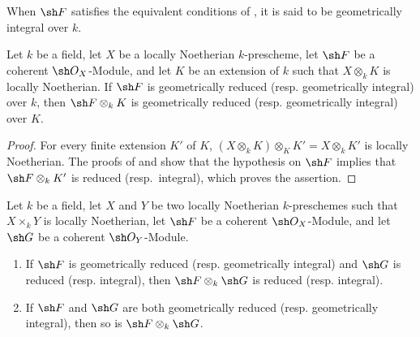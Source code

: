 \begin{definition}[4.6.19]
\label{IV.4.6.19}
When $\sh F$ satisfies the equivalent conditions of
, it is said to be geometrically integral over
$k$.
\end{definition}

\begin{proposition}[4.6.20]
\label{IV.4.6.20}
Let $k$ be a field, let $X$ be a locally Noetherian $k$-prescheme,
let $\sh F$ be a coherent $\sh O_X$-Module, and let $K$ be an
extension of $k$ such that $X\otimes_kK$ is locally Noetherian.
If $\sh F$ is geometrically reduced
\textup{(resp.} geometrically integral) over $k$, then
$\sh F\otimes_kK$ is geometrically reduced
\textup{(resp.} geometrically integral) over $K$.
\end{proposition}

\begin{proof}
For every finite extension $K'$ of $K$,
$(X\otimes_k K)\otimes_K K'=X\otimes_k K'$
is locally Noetherian.
The proofs of  and  show that the
hypothesis on $\sh F$ implies that $\sh F\otimes_kK'$ is reduced
(resp.\ integral), which proves the assertion.
\end{proof}

\begin{proposition}[4.6.21]
\label{IV.4.6.21}
Let $k$ be a field, let $X$ and $Y$ be two locally Noetherian
$k$-preschemes such that $X\times_kY$ is locally Noetherian, let
$\sh F$ be a coherent $\sh O_X$-Module, and let $\sh G$ be a coherent
$\sh O_Y$-Module.
\begin{enumerate}
\item[\rm(i)]
\label{IV.4.6.21.i}
If $\sh F$ is geometrically reduced
\textup{(resp.} geometrically integral) and $\sh G$ is reduced
\textup{(resp.} integral), then $\sh F\otimes_k\sh G$ is reduced
\textup{(resp.} integral).

\item[\rm(ii)]
\label{IV.4.6.21.ii}
If $\sh F$ and $\sh G$ are both geometrically reduced
\textup{(resp.} geometrically integral), then so is
$\sh F\otimes_k\sh G$.
\end{enumerate}
\end{proposition}

